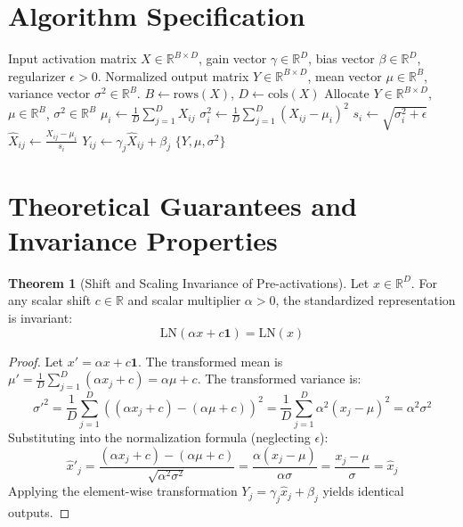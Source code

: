 \documentclass[11pt,a4paper]{article}
\theoremstyle{definition}
\newtheorem{theorem}{Theorem}[section]
\begin{document}
\section{Algorithm Specification}

\begin{algorithm}[H]
\caption{Layer Normalization Forward Transformation}
\label{alg:layer_norm}
\begin{algorithmic}[1]
\Require Input activation matrix $X \in \mathbb{R}^{B \times D}$, gain vector $\gamma \in \mathbb{R}^D$, bias vector $\beta \in \mathbb{R}^D$, regularizer $\epsilon > 0$.
\Ensure Normalized output matrix $Y \in \mathbb{R}^{B \times D}$, mean vector $\mu \in \mathbb{R}^B$, variance vector $\sigma^2 \in \mathbb{R}^B$.
\State $B \gets \text{rows}(X)$, $D \gets \text{cols}(X)$
\State Allocate $Y \in \mathbb{R}^{B \times D}$, $\mu \in \mathbb{R}^B$, $\sigma^2 \in \mathbb{R}^B$
    \State $\mu_i \gets \frac{1}{D} \sum_{j=1}^D X_{ij}$
    \State $\sigma_i^2 \gets \frac{1}{D} \sum_{j=1}^D (X_{ij} - \mu_i)^2$
    \State $s_i \gets \sqrt{\sigma_i^2 + \epsilon}$
        \State $\hat{X}_{ij} \gets \frac{X_{ij} - \mu_i}{s_i}$
        \State $Y_{ij} \gets \gamma_j \hat{X}_{ij} + \beta_j$
    \EndFor
\EndFor
\State \Return $\{Y, \mu, \sigma^2\}$
\end{algorithmic}
\end{algorithm}

\section{Theoretical Guarantees and Invariance Properties}

\begin{theorem}[Shift and Scaling Invariance of Pre-activations]
Let $x \in \mathbb{R}^D$. For any scalar shift $c \in \mathbb{R}$ and scalar multiplier $\alpha > 0$, the standardized representation is invariant:
\begin{equation}
\text{LN}(\alpha x + c \mathbf{1}) = \text{LN}(x)
\end{equation}
\end{theorem}

\begin{proof}
Let $x' = \alpha x + c \mathbf{1}$. The transformed mean is $\mu' = \frac{1}{D}\sum_{j=1}^D (\alpha x_j + c) = \alpha \mu + c$.
The transformed variance is:
\begin{equation}
\sigma'^2 = \frac{1}{D}\sum_{j=1}^D ((\alpha x_j + c) - (\alpha \mu + c))^2 = \frac{1}{D}\sum_{j=1}^D \alpha^2 (x_j - \mu)^2 = \alpha^2 \sigma^2
\end{equation}
Substituting into the normalization formula (neglecting $\epsilon$):
\begin{equation}
\hat{x}'_j = \frac{(\alpha x_j + c) - (\alpha \mu + c)}{\sqrt{\alpha^2 \sigma^2}} = \frac{\alpha (x_j - \mu)}{\alpha \sigma} = \frac{x_j - \mu}{\sigma} = \hat{x}_j
\end{equation}
Applying the element-wise transformation $Y_j = \gamma_j \hat{x}_j + \beta_j$ yields identical outputs.
\end{proof}
\end{document}
